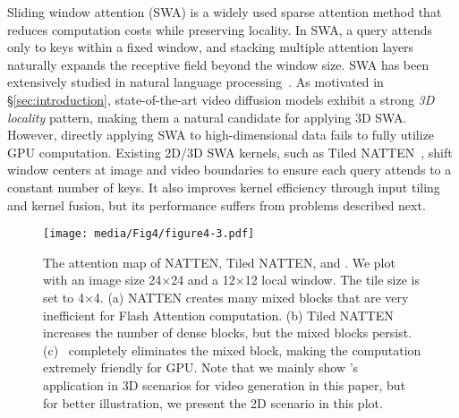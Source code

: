 Sliding window attention (SWA) is a widely used sparse attention method that reduces computation costs while preserving locality. In SWA, a query attends only to keys within a fixed window, and stacking multiple attention layers naturally expands the receptive field beyond the window size. SWA has been extensively studied in natural language processing~\citep{beltagy2020longformerlongdocumenttransformer,jiang2023mistral7b}. As motivated in \S\ref{sec:introduction}, state-of-the-art video diffusion models exhibit a strong \textit{3D locality} pattern, making them a natural candidate for applying 3D SWA. However, directly applying SWA to high-dimensional data fails to fully utilize GPU computation. Existing 2D/3D SWA kernels, such as Tiled NATTEN~\citep{hassani2023neighborhood}, shift window centers at image and video boundaries to ensure each query attends to a constant number of keys. It also improves kernel efficiency through input tiling and kernel fusion, but its performance suffers from problems described next.

\begin{figure*}[t]
    \centering
    \texttt{[image: media/Fig4/figure4-3.pdf]}
    \caption{The attention map of NATTEN, Tiled NATTEN, and \methodnameshort. We plot with an image size 24$\times$24 and a 12$\times$12 local window. The tile size is set to 4$\times$4. (a) NATTEN creates many mixed blocks that are very inefficient for Flash Attention computation. (b) Tiled NATTEN increases the number of dense blocks, but the mixed blocks persist. (c) \methodnameshort~completely eliminates the mixed block, making the computation extremely friendly for GPU. Note that we mainly show \methodnameshort's application in 3D scenarios for video generation in this paper, but for better illustration, we present the 2D scenario in this plot.}
    \label{fig:attention_map}
\end{figure*}

